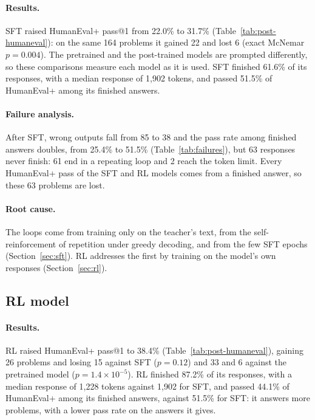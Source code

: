 \documentclass[sigconf,nonacm,balance=false]{acmart}
\begin{document}
\paragraph{Results.} SFT raised HumanEval+ pass@1 from 22.0\% to 31.7\% (Table~\ref{tab:post-humaneval}): on the same
164 problems it gained 22 and lost 6 (exact McNemar $p = 0.004$). The pretrained and the post-trained models are
prompted differently, so these comparisons measure each model as it is used. SFT finished 61.6\% of its responses,
with a median response of 1,902 tokens, and passed 51.5\% of HumanEval+ among its finished answers.

\paragraph{Failure analysis.} After SFT, wrong outputs fall from 85 to 38 and the pass rate among finished answers
doubles, from 25.4\% to 51.5\% (Table~\ref{tab:failures}), but 63 responses never finish: 61 end in a repeating loop
and 2 reach the token limit. Every HumanEval+ pass of the SFT and RL models comes from a finished answer, so these 63
problems are lost.

\paragraph{Root cause.} The loops come from training only on the teacher's text, from the self-reinforcement of
repetition under greedy decoding, and from the few SFT epochs (Section~\ref{sec:sft}). RL addresses the first by
training on the model's own responses (Section~\ref{sec:rl}).

\subsection{RL model}
\label{sec:results-rl}

\paragraph{Results.} RL raised HumanEval+ pass@1 to 38.4\% (Table~\ref{tab:post-humaneval}), gaining 26 problems and
losing 15 against SFT ($p = 0.12$) and 33 and 6 against the pretrained model ($p = 1.4 \times 10^{-5}$). RL finished
87.2\% of its responses, with a median response of 1,228 tokens against 1,902 for SFT, and passed 44.1\% of
HumanEval+ among its finished answers, against 51.5\% for SFT: it answers more problems, with a lower pass rate on the
answers it gives.
\end{document}
